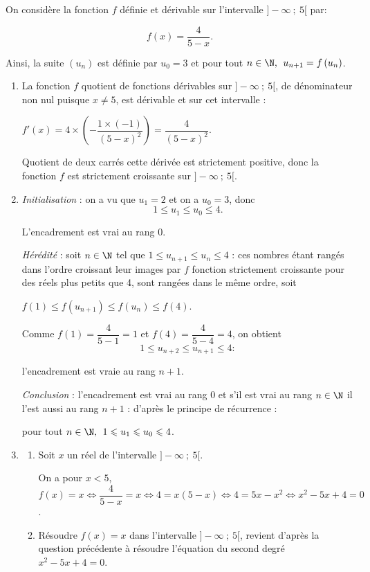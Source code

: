 On considère la fonction $f$ définie et dérivable sur l'intervalle $] -\infty~;~5[$ par:

\[f(x) = \dfrac{4}{5 - x}.\]

Ainsi, la suite $\left(u_n\right)$ est définie par $u_0 = 3$ et pour tout $n \in \N,\:\: u_{n+1}  = f\left(u_n\right)$.

\medskip

\begin{enumerate}
\item 
La fonction $f$ quotient de fonctions dérivables sur $]-\infty~;~5[$, de dénominateur non nul puisque $x \ne 5$, est dérivable et sur cet intervalle :

$f'(x) = 4 \times \left(- \dfrac{1 \times (-1)}{(5 - x)^2}\right) = \dfrac{4}{(5 - x)^2}$.

Quotient de deux carrés cette dérivée est strictement positive, donc la fonction $f$ est strictement croissante sur $]-\infty~;~5[$.
\item 

\emph{Initialisation} : on a vu que $u_1 = 2$ et on a $u_0 = 3$, donc 
\[1 \leqslant u_{1} \leqslant u_0 \leqslant 4.\]

L'encadrement est vrai au rang 0.

\emph{Hérédité} : soit $n \in \N$ tel que $1 \leqslant u_{n+1} \leqslant u_n \leqslant 4$ : ces nombres étant rangés dans l'ordre croissant leur images par $f$ fonction strictement croissante  pour des réels plus petits que 4, sont rangées dans le même ordre, soit 

$f(1) \leqslant f\left(u_{n+1}\right) \leqslant f\left(u_{n}\right) \leqslant f(4)$.

Comme $f(1) = \dfrac{4}{5 - 1} = 1$ et $f(4) = \dfrac{4}{5 - 4} = 4$, on obtient 
\[1 \leqslant u_{n+2} \leqslant u_{n+1} \leqslant 4 :\]

l'encadrement est vraie au rang $n + 1$.

\emph{Conclusion} : l'encadrement est vrai au rang 0 et s'il est vrai au rang $n \in \N$ il l'est aussi au rang $n + 1$ : d'après le principe de récurrence :

pour tout $n \in \N, \: \: 1 \leqslant u_{1} \leqslant u_0 \leqslant 4$.
\item 
	\begin{enumerate}
		\item Soit $x$ un réel de l'intervalle $]-\infty~;~5[$.




On a pour $x < 5$, \: $f(x) = x \iff \dfrac{4}{5 - x} = x \iff 4 = x(5 - x) \iff 4 = 5x - x^2 \iff x^2 - 5x + 4 = 0$.
		\item 
		Résoudre $f(x) = x$ dans l'intervalle $]-\infty~;~5[$, revient d'après la question précédente à résoudre l'équation du second degré $x^2 - 5x + 4 = 0$.
		

\end{enumerate}
\end{enumerate}
